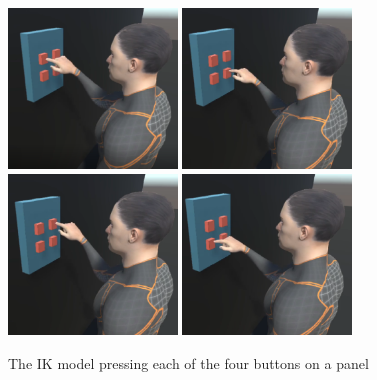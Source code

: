 \begin{figure}[h!]
    \centering
    \captionsetup{justification=centering}
    \includegraphics[width=0.4\textwidth]{grafika/h_ik_1.eps}
    \includegraphics[width=0.4\textwidth]{grafika/h_ik_2.eps}
    \includegraphics[width=0.4\textwidth]{grafika/h_ik_3.eps}
    \includegraphics[width=0.4\textwidth]{grafika/h_ik_4.eps}
    \caption{The IK model pressing each of the four buttons on a panel}
    \label{fig:h_ik_multiple}
\end{figure}



